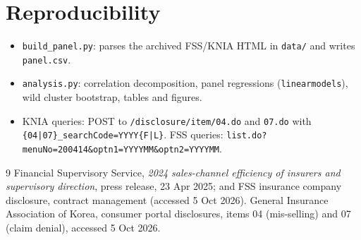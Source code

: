 \documentclass[11pt,a4paper]{article}
\begin{document}
\appendix
\section{Reproducibility}\sloppy
\begin{itemize}
  \item \texttt{build\_panel.py}: parses the archived FSS/KNIA HTML in \texttt{data/} and writes \texttt{panel.csv}.
  \item \texttt{analysis.py}: correlation decomposition, panel regressions (\texttt{linearmodels}), wild cluster bootstrap, tables and figures.
  \item KNIA queries: POST to \texttt{/disclosure/item/04.do} and \texttt{07.do} with \texttt{\{04|07\}\_searchCode=YYYY\{F|L\}}.
        FSS queries: \texttt{list.do?menuNo=200414\&optn1=YYYYMM\&optn2=YYYYMM}.
\end{itemize}

\begin{thebibliography}{9}\small
{} Financial Supervisory Service, \emph{2024 sales-channel efficiency of insurers and supervisory direction}, press release, 23 Apr 2025; and FSS insurance company disclosure, contract management (accessed 5 Oct 2026).
 General Insurance Association of Korea, consumer portal disclosures, items 04 (mis-selling) and 07 (claim denial), accessed 5 Oct 2026.
\end{thebibliography}
\end{document}
